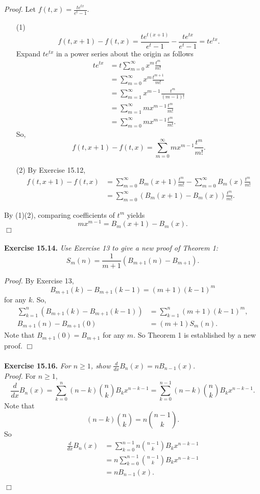 \documentclass{article}
\begin{document}
\emph{Proof.}
Let $f(t, x) = \frac{te^{tx}}{e^t - 1}$.
\begin{enumerate}
\item[(1)]
$$f(t, x+1) - f(t, x)
= \frac{te^{t(x+1)}}{e^t - 1} - \frac{te^{tx}}{e^t - 1}
= te^{tx}.$$
Expand $te^{tx}$ in a power series about the origin as follows
\begin{align*}
te^{tx}
&= t \sum_{m=0}^{\infty} x^m \frac{t^m}{m!} \\
&= \sum_{m=0}^{\infty} x^m \frac{t^{m+1}}{m!} \\
&= \sum_{m=1}^{\infty} x^{m-1} \frac{t^m}{(m-1)!} \\
&= \sum_{m=1}^{\infty} mx^{m-1} \frac{t^m}{m!} \\
&= \sum_{m=0}^{\infty} mx^{m-1} \frac{t^m}{m!}.
\end{align*}
So,
$$f(t, x+1) - f(t, x) = \sum_{m=0}^{\infty} mx^{m-1} \frac{t^m}{m!}.$$
\item[(2)]
By Exercise 15.12,
\begin{align*}
f(t, x+1) - f(t, x)
&= \sum_{m=0}^{\infty} B_m(x+1) \frac{t^m}{m!}
- \sum_{m=0}^{\infty} B_m(x) \frac{t^m}{m!} \\
&= \sum_{m=0}^{\infty} (B_m(x+1) - B_m(x)) \frac{t^m}{m!}.
\end{align*}
\end{enumerate}
By (1)(2), comparing coefficients of $t^m$ yields
$$mx^{m-1} = B_m(x+1) - B_m(x).$$
$\Box$ \\\\



\textbf{Exercise 15.14.}
\emph{Use Exercise 13 to give a new proof of Theorem 1:
$$S_m(n) = \frac{1}{m+1}(B_{m+1}(n) - B_{m+1}).$$}

\emph{Proof.}
By Exercise 13,
$$B_{m+1}(k) - B_{m+1}(k-1) = (m+1)(k-1)^m$$
for any $k$.
So,
\begin{align*}
\sum_{k=1}^{n} (B_{m+1}(k) - B_{m+1}(k-1))
&= \sum_{k=1}^{n} (m+1)(k-1)^m, \\
B_{m+1}(n) - B_{m+1}(0)
&= (m+1)S_m(n).
\end{align*}
Note that $B_{m+1}(0) = B_{m+1}$ for any $m$.
So Theorem 1 is established by a new proof.
$\Box$ \\\\



\textbf{Exercise 15.16.}
\emph{For $n \geq 1$, show $\frac{d}{dx}B_n(x) = nB_{n-1}(x)$.} \\

\emph{Proof.}
For $n \geq 1$,
$$\frac{d}{dx}B_n(x)
= \sum_{k=0}^{n}(n - k) {n \choose k} B_k x^{n - k - 1}
= \sum_{k=0}^{n-1}(n - k) {n \choose k} B_k x^{n - k - 1}.$$
Note that
$$(n-k) {n \choose k} = n {n-1 \choose k}.$$
So
\begin{align*}
\frac{d}{dx}B_n(x)
&= \sum_{k=0}^{n-1} n {n-1 \choose k} B_k x^{n - k - 1} \\
&= n \sum_{k=0}^{n-1} {n-1 \choose k} B_k x^{n - k - 1} \\
&= n B_{n-1}(x).
\end{align*}

$\Box$ \\\\
\end{document}
